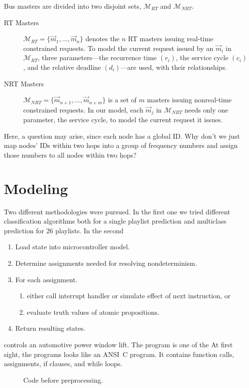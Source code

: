 \documentclass[acmtog, authorversion]{acmart}
\begin{document}
Bus masters are divided into two disjoint sets, $\mathcal{M}_{RT}$
and $\mathcal{M}_{NRT}$.
\begin{description}
\item[RT Masters]
$\mathcal{M}_{RT}=\{ \vec{m}_{1},\dots,\vec{m}_{n}\}$ denotes the
$n$ RT masters issuing real-time constrained requests. To model the
current request issued by an $\vec{m}_{i}$ in $\mathcal{M}_{RT}$,
three parameters---the recurrence time $(r_i)$, the service cycle
$(c_i)$, and the relative deadline $(d_i)$---are used, with their
relationships.
\item[NRT Masters]
$\mathcal{M}_{NRT}=\{ \vec{m}_{n+1},\dots,\vec{m}_{n+m}\}$ is a set
of $m$ masters issuing nonreal-time constrained requests. In our
model, each $\vec{m}_{j}$ in $\mathcal{M}_{NRT}$ needs only one
parameter, the service cycle, to model the current request it
issues.
\end{description}

Here, a question may arise, since each node has a global ID. Why
don't we just map nodes' IDs within two hops into a group of
frequency numbers and assign those numbers to all nodes within two
hops?

\section{Modeling}
\label{sec:sim}

Two different methodologies were pursued. In the first one we tried different classification algorithms both for a single playlist prediction and multiclass prediction for 26 playlists. In the second
\begin{enumerate}
\item Load state into microcontroller model.
\item Determine assignments needed for resolving nondeterminism.
\item For each assignment.
      \begin{enumerate}
      \item either call interrupt handler or simulate effect of next instruction, or
      \item evaluate truth values of atomic propositions.
      \end{enumerate}
\item Return resulting states.
\end{enumerate}
controls an automotive power window lift. The program is one of the
At first sight, the programs looks like an ANSI~C program. It
contains function calls, assignments, if clauses, and while loops.
\begin{figure}
  \caption{Code before preprocessing.}
  \label{fig:one}
\end{figure}
\end{document}
